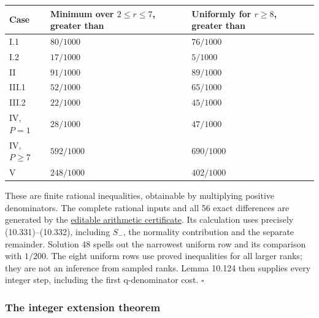 \documentclass[
  11pt,
  a4paper,
]{article}
\newcounter{none} %
\begin{document}
{\def\LTcaptype{none} %
\begin{longtable}[]{@{}
  >{\raggedright\arraybackslash}p{}
  >{\raggedleft\arraybackslash}p{}
  >{\raggedleft\arraybackslash}p{}@{}}
\toprule\noalign{}
\begin{minipage}[b]{\linewidth}\raggedright
Case
\end{minipage} & \begin{minipage}[b]{\linewidth}\raggedleft
Minimum over \(2\le r\le7\), greater than
\end{minipage} & \begin{minipage}[b]{\linewidth}\raggedleft
Uniformly for \(r\ge8\), greater than
\end{minipage} \\
\midrule\noalign{}
\endhead
\bottomrule\noalign{}
\endlastfoot
I.1 & \(80/1000\) & \(76/1000\) \\
I.2 & \(17/1000\) & \(5/1000\) \\
II & \(91/1000\) & \(89/1000\) \\
III.1 & \(52/1000\) & \(65/1000\) \\
III.2 & \(22/1000\) & \(45/1000\) \\
IV, \(P=1\) & \(28/1000\) & \(47/1000\) \\
IV, \(P\ge7\) & \(592/1000\) & \(690/1000\) \\
V & \(248/1000\) & \(402/1000\) \\
\end{longtable}
}

These are finite rational inequalities, obtainable by multiplying
positive denominators. The complete rational inputs and all 56 exact
differences are generated by the
\href{../figure_sources/integer_comparison_bounds.py}{editable
arithmetic certificate}. Its calculation uses precisely
(10.331)--(10.332), including \(S_-\), the normality contribution and
the separate remainder. Solution 48 spells out the narrowest uniform row
and its comparison with \(1/200\). The eight uniform rows use proved
inequalities for all larger ranks; they are not an inference from
sampled ranks. Lemma 10.124 then supplies every integer step, including
the first q-denominator cost. \(\square\)

\subsubsection{The integer extension
theorem}\label{the-integer-extension-theorem}
\end{document}
